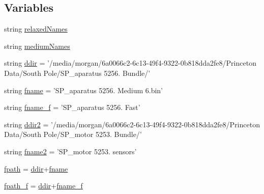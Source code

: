 \subsection*{Variables}
\begin{DoxyCompactItemize}
\item 
string \hyperlink{namespacerepo_1_1programs_1_1pythonpackages_1_1pr_1_1loadSPFiles_a92ba966a3b7423fd4d0c7874d3f92e71}{relaxed\-Names}
\item 
string \hyperlink{namespacerepo_1_1programs_1_1pythonpackages_1_1pr_1_1loadSPFiles_af4aa2bb0015793d7b7e493e4aa4f4b8c}{medium\-Names}
\item 
string \hyperlink{namespacerepo_1_1programs_1_1pythonpackages_1_1pr_1_1loadSPFiles_a65abcc2d7333a2e99d3d3376b616f959}{ddir} = '/media/morgan/6a0066c2-\/6c13-\/49f4-\/9322-\/0b818dda2fe8/\-Princeton Data/\-South Pole/\-S\-P\-\_\-aparatus 5256. Bundle/'
\item 
string \hyperlink{namespacerepo_1_1programs_1_1pythonpackages_1_1pr_1_1loadSPFiles_acfe87f91d2373c3c41bf59a6024b8a94}{fname} = 'S\-P\-\_\-aparatus 5256. Medium 6.bin'
\item 
string \hyperlink{namespacerepo_1_1programs_1_1pythonpackages_1_1pr_1_1loadSPFiles_af897386d87d4d72567fb337653aa3105}{fname\-\_\-f} = 'S\-P\-\_\-aparatus 5256. Fast'
\item 
string \hyperlink{namespacerepo_1_1programs_1_1pythonpackages_1_1pr_1_1loadSPFiles_a39efcdddf61ee790cdf9c4dfbd9e7080}{ddir2} = '/media/morgan/6a0066c2-\/6c13-\/49f4-\/9322-\/0b818dda2fe8/\-Princeton Data/\-South Pole/\-S\-P\-\_\-motor 5253. Bundle/'
\item 
string \hyperlink{namespacerepo_1_1programs_1_1pythonpackages_1_1pr_1_1loadSPFiles_a9058f0ead0c926f493bb7f6ae52a49ea}{fname2} = 'S\-P\-\_\-motor 5253. sensors'
\item 
\hyperlink{namespacerepo_1_1programs_1_1pythonpackages_1_1pr_1_1loadSPFiles_a8ffbf3fed92bc26b4248caebb30ade38}{fpath} = \hyperlink{namespacerepo_1_1programs_1_1pythonpackages_1_1pr_1_1loadSPFiles_a65abcc2d7333a2e99d3d3376b616f959}{ddir}+\hyperlink{namespacerepo_1_1programs_1_1pythonpackages_1_1pr_1_1loadSPFiles_acfe87f91d2373c3c41bf59a6024b8a94}{fname}
\item 
\hyperlink{namespacerepo_1_1programs_1_1pythonpackages_1_1pr_1_1loadSPFiles_a931d7ee8b1015ac25cbca6eee1f77bea}{fpath\-\_\-f} = \hyperlink{namespacerepo_1_1programs_1_1pythonpackages_1_1pr_1_1loadSPFiles_a65abcc2d7333a2e99d3d3376b616f959}{ddir}+\hyperlink{namespacerepo_1_1programs_1_1pythonpackages_1_1pr_1_1loadSPFiles_af897386d87d4d72567fb337653aa3105}{fname\-\_\-f}

\end{DoxyCompactItemize}
